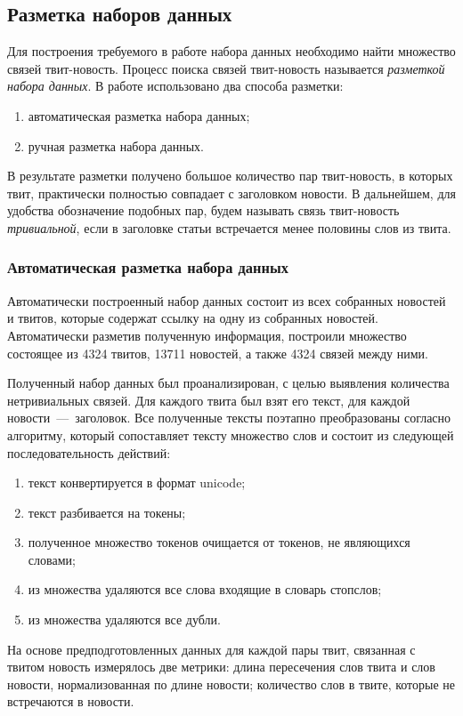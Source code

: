 \subsection{Разметка наборов данных}
    Для построения требуемого в работе набора данных необходимо найти множество связей твит-новость.
    Процесс поиска связей твит-новость называется \textit{разметкой набора данных}. В работе использовано два способа разметки:
    \begin{enumerate}
        \item автоматическая разметка набора данных;
        \item ручная разметка набора данных.
    \end{enumerate}

    В результате разметки получено большое количество пар твит-новость, в которых твит, практически полностью совпадает с заголовком новости.
    В дальнейшем, для удобства обозначение подобных пар, будем называть связь твит-новость \textit{тривиальной}, если в заголовке статьи встречается менее половины слов из твита.

    \subsubsection{Автоматическая разметка набора данных}
        Автоматически построенный набор данных состоит из всех собранных новостей и твитов, которые содержат ссылку на одну из собранных новостей.
        Автоматически разметив полученную информация, построили множество состоящее из 4324 твитов, 13711 новостей, а также 4324 связей между ними.

        Полученный набор данных был проанализирован, с целью выявления количества нетривиальных связей.
        Для каждого твита был взят его текст, для каждой новости~---~заголовок.
        Все полученные тексты поэтапно преобразованы согласно алгоритму, который сопоставляет тексту множество слов и состоит из следующей последовательность действий:
        \begin{enumerate}
            \item текст конвертируется в формат unicode;
            \item текст разбивается на токены;
            \item полученное множество токенов очищается от токенов, не являющихся словами;
            \item из множества удаляются все слова входящие в словарь стопслов;
            \item из множества удаляются все дубли.
        \end{enumerate}
        На основе предподготовленных данных для каждой пары твит, связанная с твитом новость измерялось две метрики:
        длина пересечения слов твита и слов новости, нормализованная по длине новости;
        количество слов в твите, которые не встречаются в новости.

